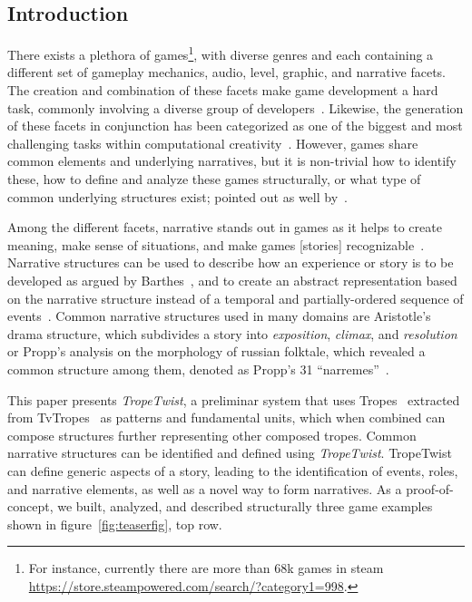 \subsection{Introduction}

There exists a plethora of games\footnote{For instance, currently there are more than 68k games in steam \url{https://store.steampowered.com/search/?category1=998}.}, with diverse genres and each containing a different set of gameplay mechanics, audio, level, graphic, and narrative facets. The creation and combination of these facets make game development a hard task, commonly involving a diverse group of developers~. Likewise, the generation of these facets in conjunction has been categorized as one of the biggest and most challenging tasks within computational creativity~. However, games share common elements and underlying narratives, but it is non-trivial how to identify these, how to define and analyze these games structurally, or what type of common underlying structures exist; pointed out as well by~.

Among the different facets, narrative stands out in games as it helps to create meaning, make sense of situations, and make games [stories] recognizable~. Narrative structures can be used to describe how an experience or story is to be developed as argued by Barthes~, and to create an abstract representation based on the narrative structure instead of a temporal and partially-ordered sequence of events~. Common narrative structures used in many domains are Aristotle's drama structure, which subdivides a story into \textit{exposition}, \textit{climax}, and \textit{resolution} or Propp's analysis on the morphology of russian folktale, which revealed a common structure among them, denoted as Propp's 31 ``narremes''~.

This paper presents \emph{TropeTwist}, a preliminar system that uses Tropes~ extracted from TvTropes~ as patterns and fundamental units, which when combined can compose structures further representing other composed tropes. Common narrative structures can be identified and defined using \emph{TropeTwist}. TropeTwist can define generic aspects of a story, leading to the identification of events, roles, and narrative elements, as well as a novel way to form narratives. As a proof-of-concept, we built, analyzed, and described structurally three game examples shown in figure~\ref{fig:teaserfig}, top row.

